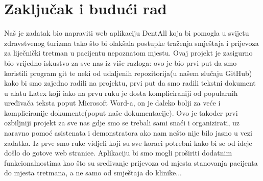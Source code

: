 \chapter{Zaključak i budući rad}

		 Naš je zadatak bio napraviti web aplikaciju DentAll koja bi pomogla u svijetu zdravstvenog turizma tako što bi olakšala postupke traženja smještaja i prijevoza za liječnički tretman u pacijentu nepoznatom mjestu. Ovaj projekt je zasigurno bio vrijedno iskustvo za sve nas iz više razloga: ovo je bio prvi put da smo koristili program git te neki od udaljenih repozitorija(u našem slučaju GitHub) kako bi smo zajedno radili na projektu, prvi put da smo radili tekstni dokument u alatu Latex koji iako na prvu ruku je dosta kompliciraniji od popularnih uređivača teksta poput Microsoft Word-a, on je daleko bolji za veće i kompliciranije dokumente(poput naše dokumentacije). Ovo je također prvi ozbiljniji projekt za sve nas gdje smo se trebali sami snaći i organizirati, uz naravno pomoć asistenata i demonstratora ako nam nešto nije bilo jasno u vezi zadatka. Iz prve smo ruke vidjeli koji su sve koraci potrebni kako bi se od ideje došlo do gotove web stranice. Aplikaciju bi smo mogli proširiti dodatnim funkcionalnostima kao što su sređivanje prijevoza od mjesta stanovanja pacijenta do mjesta tretmana, a ne samo od smještaja do klinike...
		
		\eject 
